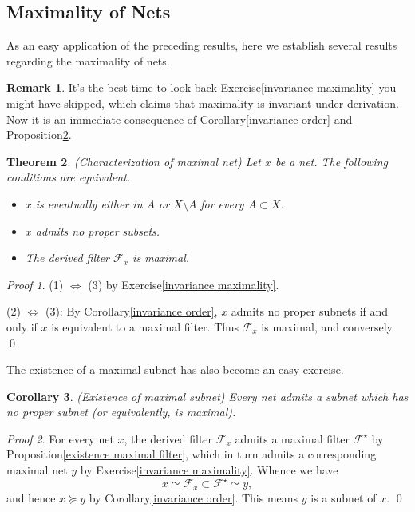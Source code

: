 \documentclass[a4paper,12pt]{article}
\newtheorem{thm}{Theorem}[section]
\newtheorem{cor}[thm]{Corollary}
\theoremstyle{remark}
\newtheorem*{prf}{Proof}
\theoremstyle{definition}
\newtheorem{rem}[thm]{Remark}
\theoremstyle{definition}
\theoremstyle{definition}
\begin{document}
\subsection{Maximality of Nets}
As an easy application of the preceding results, here we establish several results regarding the maximality of nets.

\begin{rem}
	It's the best time to look back Exercise\ref{invariance maximality} you might have skipped, which claims that maximality is invariant under derivation. Now it is an immediate consequence of Corollary\ref{invariance order} and Proposition\ref{characterize maximal net}.
\end{rem}

\begin{thm}\label{characterize maximal net} (Characterization of maximal net)
	Let \( x \) be a net. The following conditions are equivalent.
	\begin{itemize}
		\item[(1)] \( x \) is eventually either in \( A \) or \( X \setminus A \) for every \( A \subset X \).
		\item[(2)] \( x \) admits no proper subsets.
		\item[(3)] The derived filter \( \mathscr{F}_x \) is maximal.
	\end{itemize}
\end{thm}
\begin{prf}
	(1) \( \iff  \) (3) by Exercise\ref{invariance maximality}.

	(2) \( \iff  \) (3): By Corollary\ref{invariance order}, \( x \) admits no proper subnets if and only if \( x \) is equivalent to a maximal filter.
	Thus \( \mathscr{F}_x \) is maximal, and conversely.
	\qed\end{prf}

The existence of a maximal subnet has also become an easy exercise.
\begin{cor} (Existence of maximal subnet)
	Every net admits a subnet which has no proper subnet (or equivalently, is maximal).
\end{cor}
\begin{prf}
	For every net \( x \), the derived filter \( \mathscr{F}_x \) admits a maximal filter \( \mathscr{F}^{\star} \) by Proposition\ref{existence maximal filter}, which in turn admits a corresponding maximal net \( y \) by Exercise\ref{invariance maximality}. Whence we have
	\[
		x \simeq \mathscr{F}_x \subset \mathscr{F}^{\star} \simeq y,
	\]
	and hence \( x \succeq y \) by Corollary\ref{invariance order}. This means \( y \) is a subnet of \( x \).
	\qed\end{prf}
\end{document}
